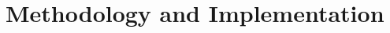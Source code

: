 \documentclass[12pt, letterpaper]{article}
\begin{document}





\section{Methodology and Implementation}
\end{document}
